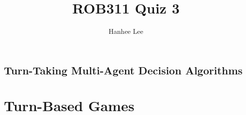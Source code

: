 \documentclass{article}
\title{ROB311 Quiz 3}
\author{Hanhee Lee}
\begin{document}
\maketitle

\tableofcontents
\newpage

\begin{center}
    \section*{Turn-Taking Multi-Agent Decision Algorithms}
\end{center}
\section{Turn-Based Games}

\newpage
\end{document}
